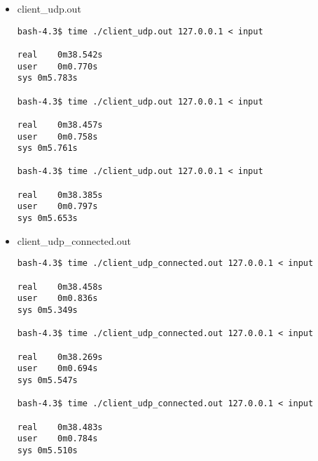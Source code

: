 \documentclass[a4paper,10pt]{article}
\begin{document}
\begin{itemize}
\item client\_udp.out

\begin{lstlisting}
bash-4.3$ time ./client_udp.out 127.0.0.1 < input 

real	0m38.542s
user	0m0.770s
sys	0m5.783s

bash-4.3$ time ./client_udp.out 127.0.0.1 < input 

real	0m38.457s
user	0m0.758s
sys	0m5.761s

bash-4.3$ time ./client_udp.out 127.0.0.1 < input 

real	0m38.385s
user	0m0.797s
sys	0m5.653s

\end{lstlisting}

\item client\_udp\_connected.out

\begin{lstlisting}
bash-4.3$ time ./client_udp_connected.out 127.0.0.1 < input 

real	0m38.458s
user	0m0.836s
sys	0m5.349s

bash-4.3$ time ./client_udp_connected.out 127.0.0.1 < input 

real	0m38.269s
user	0m0.694s
sys	0m5.547s

bash-4.3$ time ./client_udp_connected.out 127.0.0.1 < input 

real	0m38.483s
user	0m0.784s
sys	0m5.510s

\end{lstlisting}

\end{itemize}
\end{document}
